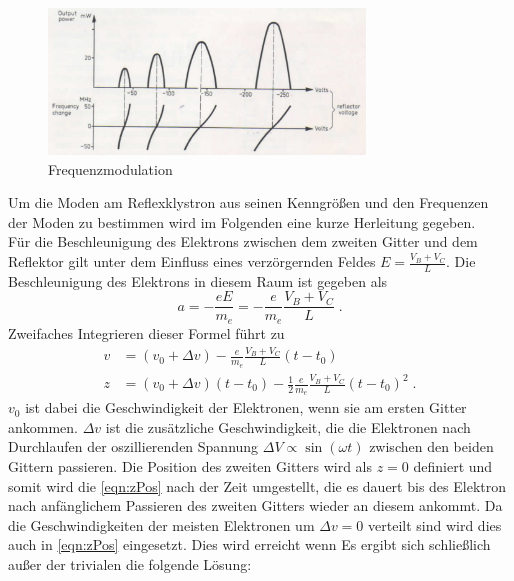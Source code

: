         \begin{figure}
            \centering
            \includegraphics[width = 0.75\textwidth]{bilder/Frequenzmodulation.png}
            \caption{Frequenzmodulation}
            \label{fig:frequenzmodulation}
        \end{figure}
        Um die Moden am Reflexklystron aus seinen Kenngrößen und den Frequenzen der Moden zu bestimmen wird im Folgenden eine kurze Herleitung gegeben.\\
        Für die Beschleunigung des Elektrons zwischen dem  zweiten Gitter und dem Reflektor gilt unter dem Einfluss eines verzörgernden Feldes $E = \frac{V_B + V_C}{L}$.
        Die Beschleunigung des Elektrons in diesem Raum ist gegeben als
        \begin{equation*}
            a = -\frac{e E}{m_e} = - \frac{e}{m_e} \frac{V_B + V_C}{L} \;.
        \end{equation*}
        Zweifaches Integrieren dieser Formel führt zu
        \begin{align}
            v &= (v_0 + \Delta v) - \frac{e}{m_e} \frac{V_B + V_C}{L} (t - t_0) \\[3pt]
            z &= (v_0 + \Delta v) (t - t_0) - \frac{1}{2} \frac{e}{m_e} \frac{V_B + V_C}{L} (t - t_0)^2 \;.
            \label{eqn:zPos}
        \end{align}
        $v_0$ ist dabei die Geschwindigkeit der Elektronen, wenn sie am ersten Gitter ankommen.
        $\Delta v$ ist die zusätzliche Geschwindigkeit, die die Elektronen nach Durchlaufen der oszillierenden Spannung $\Delta V \propto \sin(\omega t)$ zwischen den beiden Gittern passieren.
        Die Position des zweiten Gitters wird als $z = 0$ definiert und somit wird die \autoref{eqn:zPos} nach der Zeit umgestellt, die es dauert bis des Elektron nach anfänglichem Passieren des zweiten Gitters wieder an diesem ankommt.
        Da die Geschwindigkeiten der meisten Elektronen um $\Delta v = 0$ verteilt sind wird dies auch in \autoref{eqn:zPos} eingesetzt.
        Dies wird erreicht wenn 
        Es ergibt sich schließlich außer der trivialen die folgende Lösung:
